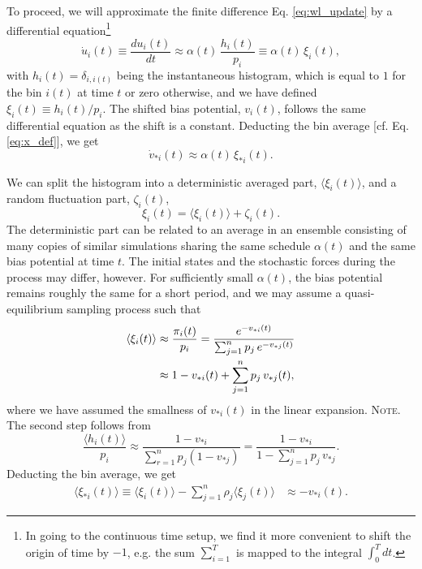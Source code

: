\documentclass[reprint, superscriptaddress, floatfix]{revtex4-1}
\newcommand{\note}[1]{{\color{DarkGreen}\footnotesize \textsc{Note.} #1}}
\begin{document}
To proceed, we will
approximate the finite difference Eq. \eqref{eq:wl_update}
by a differential equation\footnote{In
going to the continuous time setup,
we find it more convenient to shift the origin of time by $-1$,
e.g. the sum $\sum_{i=1}^T$ is mapped to the integral $\int_0^T dt$.}
%
\begin{equation}
  \dot u_i(t)
  \equiv
  \frac{ d u_i(t) } { dt }
  \approx
  \alpha(t) \, \frac{ h_i(t) } { p_i }
  \equiv
  \alpha(t) \, \xi_i(t)
  ,
  \label{eq:ut_diffeq}
\end{equation}
%
with
%
$h_i(t) = \delta_{i, i(t)}$
%
being the instantaneous histogram,
which is equal to $1$
for the bin $i(t)$ at time $t$
or zero otherwise,
and we have defined
$\xi_i(t) \equiv h_i(t) /p_i$.
%
The shifted bias potential, $v_i(t)$,
follows the same differential equation
as the shift is a constant.
%
Deducting the bin average [cf. Eq. \eqref{eq:x_def}],
we get
%
\begin{equation}
  \dot v_{*i}(t)
  \approx
  \alpha(t) \, \xi_{*i}(t)
  .
  \label{eq:vt_diffeq}
\end{equation}


We can split the histogram into
a deterministic averaged part, $\langle \xi_i(t) \rangle$,
and a random fluctuation part, $\zeta_i(t)$,
%
\begin{equation}
  \xi_i(t) =
  \langle \xi_i(t) \rangle
  +
  \zeta_i(t)
  .
  \label{eq:h_split}
\end{equation}
%
The deterministic part can be related
to an average in an ensemble consisting of
many copies of similar simulations
sharing the same schedule $\alpha(t)$
and the same bias potential at time $t$.
%
The initial states and the stochastic forces
during the process may differ, however.
%
For sufficiently small $\alpha(t)$,
the bias potential remains roughly the same for a short period,
and we may assume a quasi-equilibrium sampling process
such that
%
\begin{align}
  \langle \xi_i(t) \rangle
  &\approx
  \frac{ \pi_i(t) } { p_i }
  =
  \frac{                       e^{-v_{*i}(t)} }
       { \sum_{j = 1}^n p_j \, e^{-v_{*j}(t)} }
  \notag
  \\
  &\approx
  1 - v_{*i}(t) + \sum_{j = 1}^n p_j \, v_{*j}(t)
  ,
  \notag
\end{align}
%
where we have assumed the smallness
of $v_{*i}(t)$ in the linear expansion.
%
\note{
The second step follows from
$$
\frac{ \langle h_i(t) \rangle }
     { p_i }
\approx
\frac{                       1 - v_{*i}  }
     { \sum_{ r = 1 }^n p_j (1 - v_{*j}) }
=
\frac{                       1 - v_{*i}  }
     { 1 - \sum_{ j = 1 }^n p_j \, v_{*j} }
.
$$
}%
%
Deducting the bin average, we get
%
\begin{align}
  \langle \xi_{*i}(t) \rangle
  \equiv
  \langle \xi_i(t) \rangle -
  \sum_{j=1}^n \rho_j \langle \xi_j(t) \rangle
  &\approx
  - v_{*i}(t)
  .
  \label{eq:sh_ave}
\end{align}
\end{document}
